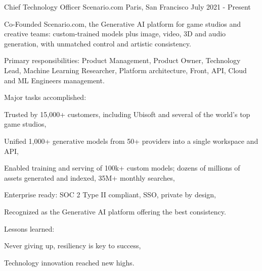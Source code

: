 \begin{cventries}
  \cventry
    {Chief Technology Officer} %
    {Scenario.com} %
    {Paris, San Francisco} %
    {July 2021 - Present} %
    {
      \begin{cvitems} %
        \item {Co-Founded Scenario.com, the Generative AI platform for game studios and creative teams: custom-trained models plus image, video, 3D and audio generation, with unmatched control and artistic consistency.}
        \item {Primary responsibilities: Product Management, Product Owner, Technology Lead, Machine Learning Researcher, Platform architecture, Front, API, Cloud and ML Engineers management.}
        \item {Major tasks accomplished:}
        \begin{cvsubitems}
          \item {Trusted by 15,000+ customers, including Ubisoft and several of the world's top game studios,}
          \item {Unified 1,000+ generative models from 50+ providers into a single workspace and API,}
          \item {Enabled training and serving of 100k+ custom models; dozens of millions of assets generated and indexed, 35M+ monthly searches,}
          \item {Enterprise ready: SOC 2 Type II compliant, SSO, private by design,}
          \item {Recognized as the Generative AI platform offering the best consistency.}
        \end{cvsubitems}
        \item {Lessons learned:}
        \begin{cvsubitems}
          \item {Never giving up, resiliency is key to success,}
          \item {Technology innovation reached new highs.}
        \end{cvsubitems}
      \end{cvitems}
    }


\end{cventries}
